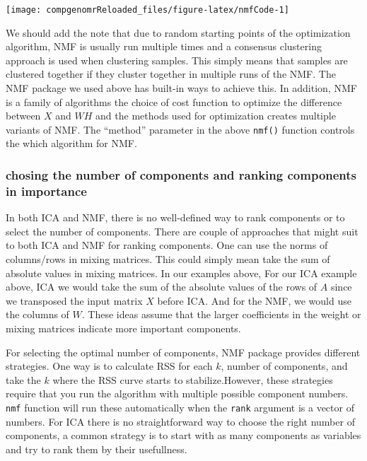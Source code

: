 \documentclass[12pt,]{krantz}
\theoremstyle{definition}
\theoremstyle{definition}
\theoremstyle{definition}
\theoremstyle{remark}
\begin{document}
\begin{center}\texttt{[image: compgenomrReloaded\_files/figure-latex/nmfCode-1]} \end{center}

We should add the note that due to random starting points of the
optimization algorithm, NMF is usually run multiple times and a
consensus clustering approach is used when clustering samples. This
simply means that samples are clustered together if they cluster
together in multiple runs of the NMF. The NMF package we used above has
built-in ways to achieve this. In addition, NMF is a family of
algorithms the choice of cost function to optimize the difference
between \(X\) and \(WH\) and the methods used for optimization creates
multiple variants of NMF. The ``method'' parameter in the above
\texttt{nmf()} function controls the which algorithm for NMF.

\hypertarget{chosing-the-number-of-components-and-ranking-components-in-importance}{%
\subsubsection{chosing the number of components and ranking components
in
importance}\label{chosing-the-number-of-components-and-ranking-components-in-importance}}

In both ICA and NMF, there is no well-defined way to rank components or
to select the number of components. There are couple of approaches that
might suit to both ICA and NMF for ranking components. One can use the
norms of columns/rows in mixing matrices. This could simply mean take
the sum of absolute values in mixing matrices. In our examples above,
For our ICA example above, ICA we would take the sum of the absolute
values of the rows of \(A\) since we transposed the input matrix \(X\)
before ICA. And for the NMF, we would use the columns of \(W\). These
ideas assume that the larger coefficients in the weight or mixing
matrices indicate more important components.

For selecting the optimal number of components, NMF package provides
different strategies. One way is to calculate RSS for each \(k\), number
of components, and take the \(k\) where the RSS curve starts to
stabilize.However, these strategies require that you run the algorithm
with multiple possible component numbers. \texttt{nmf} function will run
these automatically when the \texttt{rank} argument is a vector of
numbers. For ICA there is no straightforward way to choose the right
number of components, a common strategy is to start with as many
components as variables and try to rank them by their usefullness.
\end{document}
